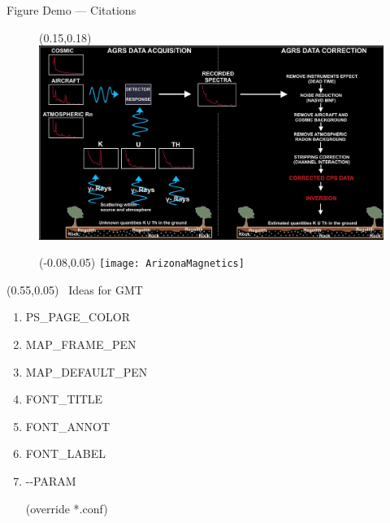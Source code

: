\documentclass[dark]{cgem-presentation}
\begin{document}
  \begin{frame}{Figure Demo --- Citations}
    \begin{figure}
      \begin{textblock*}{0.7\paperwidth}(0.15\paperwidth,0.18\paperheight)
        \includegraphics[width=0.7\paperwidth]{Weihermann2021}
      \end{textblock*}
    \end{figure}

  \end{frame}

  \begin{frame}
    \begin{figure}
      \begin{textblock*}{0.7\paperwidth}(-0.08\paperwidth,0.05\paperheight)
        \texttt{[image: ArizonaMagnetics]}
      \end{textblock*}
    \end{figure}
    \begin{textblock*}{0.5\paperwidth}(0.55\paperwidth,0.05\paperheight)
      \Huge
      \,\,\,Ideas for GMT
      \begin{enumerate}
        \item PS\_PAGE\_COLOR
        \item MAP\_FRAME\_PEN
        \item MAP\_DEFAULT\_PEN
        \item FONT\_TITLE
        \item FONT\_ANNOT
        \item FONT\_LABEL
        \item -\hspace{0.1mm}-PARAM

          (override *.conf)
      \end{enumerate}
    \end{textblock*}

  \end{frame}
\end{document}
